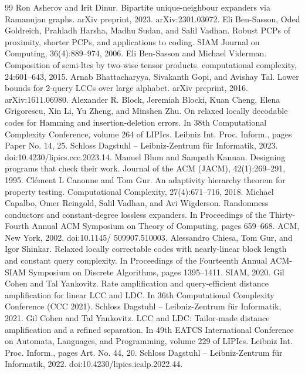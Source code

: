 \begin{thebibliography}{99}
 Ron Asherov and Irit Dinur. Bipartite unique-neighbour expanders via Ramanujan graphs. arXiv preprint, 2023. arXiv:2301.03072.
 Eli Ben-Sasson, Oded Goldreich, Prahladh Harsha, Madhu Sudan, and Salil Vadhan. Robust PCPs of proximity, shorter PCPs, and applications to coding. SIAM Journal on Computing, 36(4):889–974, 2006.
 Eli Ben-Sasson and Michael Viderman. Composition of semi-ltcs by two-wise tensor products. computational complexity, 24:601–643, 2015.
 Arnab Bhattacharyya, Sivakanth Gopi, and Avishay Tal. Lower bounds for 2-query LCCs over large alphabet. arXiv preprint, 2016. arXiv:1611.06980.
 Alexander R. Block, Jeremiah Blocki, Kuan Cheng, Elena Grigorescu, Xin Li, Yu Zheng, and Minshen Zhu. On relaxed locally decodable codes for Hamming and insertion-deletion errors. In 38th Computational Complexity Conference, volume 264 of LIPIcs. Leibniz Int. Proc. Inform., pages Paper No. 14, 25. Schloss Dagstuhl – Leibniz-Zentrum für Informatik, 2023. doi:10.4230/lipics.ccc.2023.14.
 Manuel Blum and Sampath Kannan. Designing programs that check their work. Journal of the ACM (JACM), 42(1):269–291, 1995.
 Clément L Canonne and Tom Gur. An adaptivity hierarchy theorem for property testing. Computational Complexity, 27(4):671–716, 2018.
 Michael Capalbo, Omer Reingold, Salil Vadhan, and Avi Wigderson. Randomness conductors and constant-degree lossless expanders. In Proceedings of the Thirty-Fourth Annual ACM Symposium on Theory of Computing, pages 659–668. ACM, New York, 2002. doi:10.1145/ 509907.510003.
 Alessandro Chiesa, Tom Gur, and Igor Shinkar. Relaxed locally correctable codes with nearly-linear block length and constant query complexity. In Proceedings of the Fourteenth Annual ACM-SIAM Symposium on Discrete Algorithms, pages 1395–1411. SIAM, 2020.
 Gil Cohen and Tal Yankovitz. Rate amplification and query-efficient distance amplification for linear LCC and LDC. In 36th Computational Complexity Conference (CCC 2021). Schloss Dagstuhl – Leibniz-Zentrum für Informatik, 2021.
 Gil Cohen and Tal Yankovitz. LCC and LDC: Tailor-made distance amplification and a refined separation. In 49th EATCS International Conference on Automata, Languages, and Programming, volume 229 of LIPIcs. Leibniz Int. Proc. Inform., pages Art. No. 44, 20. Schloss Dagstuhl – Leibniz-Zentrum für Informatik, 2022. doi:10.4230/lipics.icalp.2022.44.

\end{thebibliography}
